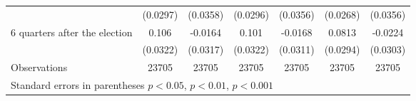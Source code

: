 \begin{table}[!ht]
\begin{tabular}{l*{6}{c}}
                    &    (0.0297)         &    (0.0358)         &    (0.0296)         &    (0.0356)         &    (0.0268)         &    (0.0356)         \\
[0,12em]
 6 quarters after the election&       0.106\sym{**} &     -0.0164         &       0.101\sym{**} &     -0.0168         &      0.0813\sym{**} &     -0.0224         \\
                    &    (0.0322)         &    (0.0317)         &    (0.0322)         &    (0.0311)         &    (0.0294)         &    (0.0303)         \\
\hline
Observations        &       23705         &       23705         &       23705         &       23705         &       23705         &       23705         \\
\hline\hline
\multicolumn{7}{l}{ Standard errors in parentheses \sym{*} \(p<0.05\), \sym{**} \(p<0.01\), \sym{***} \(p<0.001\)}\\
\end{tabular}
\end{table}

